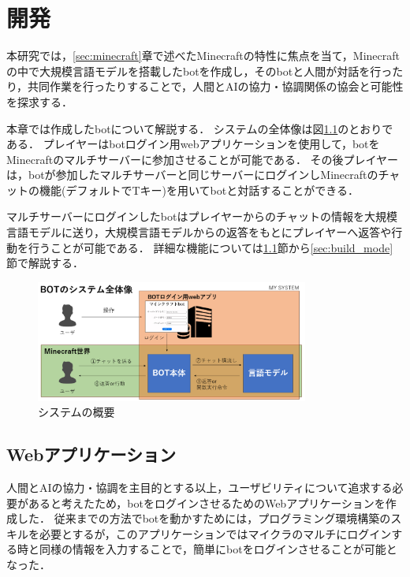\chapter{開発} 
\thispagestyle{plain}   %

本研究では，\ref{sec:minecraft}章で述べたMinecraftの特性に焦点を当て，Minecraftの中で大規模言語モデルを搭載したbotを作成し，そのbotと人間が対話を行ったり，共同作業を行ったりすることで，人間とAIの協力・協調関係の協会と可能性を探求する．

本章では作成したbotについて解説する．
システムの全体像は図\ref{fig:system}のとおりである．
プレイヤーはbotログイン用webアプリケーションを使用して，botをMinecraftのマルチサーバーに参加させることが可能である．
その後プレイヤーは，botが参加したマルチサーバーと同じサーバーにログインしMinecraftのチャットの機能(デフォルトでTキー)を用いてbotと対話することができる．

マルチサーバーにログインしたbotはプレイヤーからのチャットの情報を大規模言語モデルに送り，大規模言語モデルからの返答をもとにプレイヤーへ返答や行動を行うことが可能である．
詳細な機能については\ref{sec:webapp}節から\ref{sec:build_mode}節で解説する．

\begin{figure}[H]
    \centering
    \includegraphics[width=0.8\textwidth]{fig/my_system.PNG}
    \caption{システムの概要}
    \label{fig:system}
\end{figure}

\section{Webアプリケーション}\label{sec:webapp}
人間とAIの協力・協調を主目的とする以上，ユーザビリティについて追求する必要があると考えたため，botをログインさせるためのWebアプリケーションを作成した．
従来までの方法でbotを動かすためには，プログラミング環境構築のスキルを必要とするが，このアプリケーションではマイクラのマルチにログインする時と同様の情報を入力することで，簡単にbotをログインさせることが可能となった．

